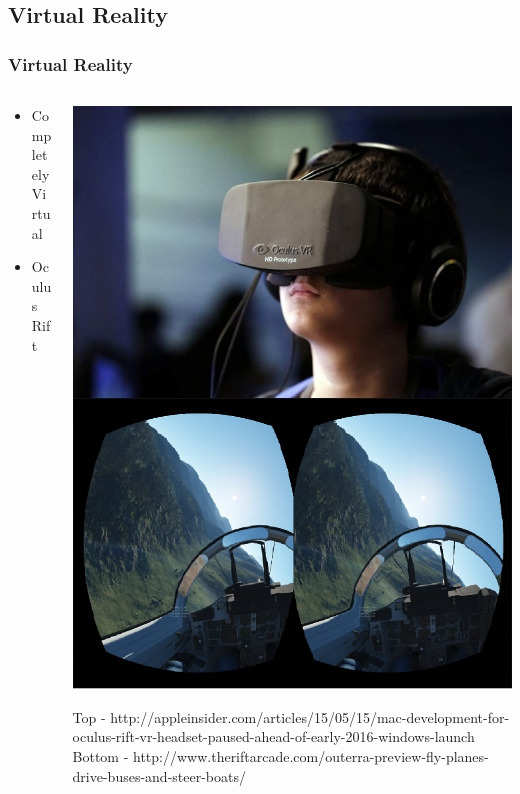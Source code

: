 \documentclass{beamer}
\begin{document}
\subsection{Virtual Reality}
\begin{frame}
	\frametitle{Virtual Reality}
	\begin{columns}
    \begin{column}{0.4\textwidth}
	\begin{itemize}
		\item Completely Virtual
		\item Oculus Rift
	\end{itemize}
	\end{column}
	\begin{column}{0.4\textwidth}
	\includegraphics[width=\textwidth]{images/OculusRift}
	
	\tiny Top - http://appleinsider.com/articles/15/05/15/mac-development-for-oculus-rift-vr-headset-paused-ahead-of-early-2016-windows-launch
	Bottom - http://www.theriftarcade.com/outerra-preview-fly-planes-drive-buses-and-steer-boats/
	\end{column}
    \end{columns}
\end{frame}
\end{document}
